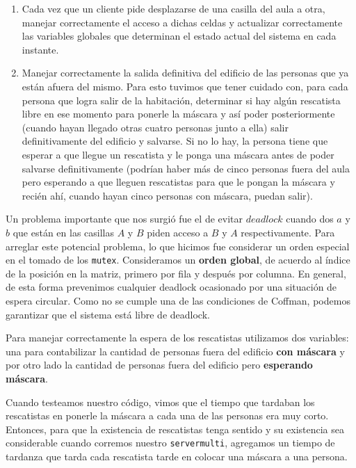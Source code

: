 \documentclass[11pt, a4paper, twoside]{article}
\begin{document}
\begin{enumerate}
\item Cada vez que un cliente pide desplazarse de una casilla del aula a otra, manejar correctamente el
  acceso a dichas celdas y actualizar correctamente las variables globales que determinan el estado actual
  del sistema en cada instante.
\item Manejar correctamente la salida definitiva del edificio de las personas que ya están afuera del mismo.
  Para esto tuvimos que tener cuidado con,  para cada persona que logra salir de la habitación, determinar
  si hay algún rescatista libre en ese momento para ponerle la máscara y así poder posteriormente (cuando
  hayan llegado otras cuatro personas junto a ella) salir definitivamente del edificio y salvarse. Si no lo
  hay, la persona tiene que esperar a que llegue un rescatista y le ponga una máscara antes de poder salvarse
  definitivamente (podrían haber más de cinco personas fuera del aula pero esperando a que lleguen rescatistas
  para que le pongan la máscara y recién ahí, cuando hayan cinco personas con máscara, puedan salir).

\end{enumerate}

\par Un problema importante que nos surgió fue el de evitar $deadlock$ cuando dos $a$ y $b$ que están en las
casillas $A$ y $B$ piden acceso a $B$ y $A$ respectivamente. Para arreglar este potencial problema, lo que
hicimos fue considerar un orden especial en el tomado de los \texttt{mutex}. Consideramos un \textbf{orden global}, de acuerdo al índice de la posición en la matriz, primero por fila y después por columna. En general, de esta forma prevenimos cualquier deadlock ocasionado por una situación de espera circular. Como no se cumple una de las condiciones de Coffman, podemos garantizar que el sistema está libre de deadlock.

\par Para manejar correctamente la espera de los rescatistas utilizamos dos variables: una para contabilizar
la cantidad de personas fuera del edificio \textbf{con máscara} y por otro lado la cantidad de personas
fuera del edificio pero \textbf{esperando máscara}.

\par Cuando testeamos nuestro código, vimos que el tiempo que tardaban los rescatistas en ponerle la máscara
a cada una de las personas era muy corto. Entonces, para que la existencia de rescatistas tenga sentido y su
existencia sea considerable cuando corremos nuestro \texttt{servermulti}, agregamos un tiempo de tardanza
que tarda cada rescatista tarde en colocar una máscara a una persona.
\end{document}
